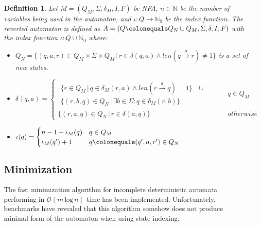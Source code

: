 \documentclass[pdflatex,sn-mathphys-num]{sn-jnl}%
\theoremstyle{thmstyleone}%
\theoremstyle{thmstyletwo}%
\theoremstyle{thmstylethree}%
\newtheorem{definition}{Definition}%
\begin{document}
        \begin{definition}
            Let $M = (Q_M, \Sigma, \delta_M, I, F)$ be NFA, $n \in \mathbb{N}$ be the number of variables being used in the automaton, and $\iota : Q \rightarrow \mathbb{N}_0$ be the index function. The reverted automaton is defined as $A = (Q \colonequals Q_N \cup Q_M, \Sigma, \delta, I, F)$ with the index function $\iota : Q \cup \mathbb{N}_0$ where:
            \begin{itemize}
                \item $Q_N = \{(q, a, r) \in Q_M \times \Sigma \times Q_M\,|\,r \in \delta(q, a) \land len(q \xrightarrow[]{a}r) \neq 1\}$ is a set of new states.
                \vspace*{0.5em}
                \item $\delta(q, a) =
                \begin{cases}
                    \begin{aligned}
                        \{r \in Q_M\,|\,q \in \delta_M(r, a) \land len(r \xrightarrow[]{a} q) = 1\}&\, \cup\\
                        \{(r, b, q) \in Q_N\,|\,\exists b \in \Sigma : q \in \delta_M(r, b)\}&
                    \end{aligned} \hspace{1cm} &q \in Q_M\\[1em]
                    \{(r, a, q) \in Q_N\,|\, r \in \delta(a, q)\}  & otherwise
                \end{cases}
                $
                \vspace*{0.5em}
                \item $\iota(q) =
                \begin{cases}
                    n - 1 - \iota_M(q) & q \in Q_M\\
                    \iota_M(q') + 1 & q \colonequals (q', a, r') \in Q_N

                \end{cases}
                $
            \end{itemize}
        \end{definition}

    \subsection{Minimization}
        The fast minimization algorithm for incomplete deterministic automata \cite{Minimization} performing in $\mathcal{O}(m\, \text{log}\, n)$ time has been implemented. Unfortunately, benchmarks have revealed that this algorithm somehow does not produce minimal form of the automaton when using state indexing.
\end{document}
